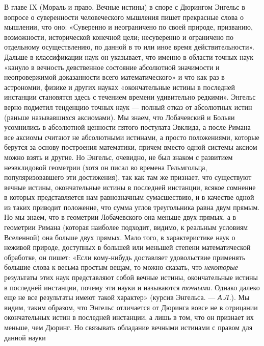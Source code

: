 В главе IX (Мораль и право,  Вечные истины) в споре с Дюрингом Энгельс
в вопросе о суверенности человеческого мышления пишет прекрасные слова
о  мышлении, что  оно:  «Суверенно и  неограничено  по своей  природе,
призванию,  возможности,  исторической  конечной цели;  несуверенно  и
ограничено  по  отдельному осуществлению,  по  данной  в то  или  иное
время  действительности». Дальше  в классификации  наук он  указывает,
что  именно  в области  точных  наук  «кануло в  вечность  девственное
состояние  абсолютной значимости  и неопровержимой  доказанности всего
математического»  и  что  как  раз   в  астрономии,  физике  и  других
науках «окончательные  истины в  последней инстанции  становятся здесь
с  течением  времени  удивительно  редкими».  Энгельс  верно  подметил
тенденцию точных  наук ---  полный отказ  от абсолютных  истин (раньше
называвшихся аксиомами). Мы знаем, что Лобачевский и Больяи усомнились
в  абсолютной  ценности  пятого  постулата  Эвклида,  а  после  Римана
все  аксиомы считают  не абсолютными  истинами, а  просто положениями,
которые берутся  за основу построения математики,  причем вместо одной
системы  аксиом  можно  взять  и  другие.  Но  Энгельс,  очевидно,  не
был  знаком  с развитием  неэвклидовой  геометрии  (хотя он  писал  во
времена Гельмгольца,  популяризовавшего эти  достижения), так  как там
же  признает, что  существуют  вечные истины,  окончательные истины  в
последней  инстанции, всякое  сомнение  в  которых представляется  нам
равнозначным  сумасшествию,  и  в  качестве одной  из  таких  приводит
положение,  что  сумма  углов   треугольника  равна  двум  прямым.  Но
мы  знаем,  что  в  геометрии Лобачевского  она  меньше  двух  прямых,
а   в  геометрии   Римана  (которая   наиболее  подходит,   видимо,  к
реальным  условиям Вселенной)  она больше  двух прямых.  Мало того,  в
характеристике  наук  о  неживой  природе,  доступных  в  большей  или
меньшей степени математической обработке,  он пишет: «Если кому-нибудь
доставляет  удовольствие  применять  большие слова  к  весьма  простым
вещам,  то можно  сказать, что  \emph{некоторые} результаты  этих наук
представляют  собой вечные  истины, окончательные  истины в  последней
инстанции,  почему  эти  науки  и  называются  \emph{точными}.  Однако
далеко еще не  все результаты имеют такой  характер» (курсив Энгельса.
---  \emph{А.Л.}). Мы  видим,  таким образом,  что Энгельс  отличается
от  Дюринга  вовсе не  в  отрицании  окончательных истин  в  последней
инстанции, а  лишь в том,  что он признает  их меньше, чем  Дюринг. Но
связывать  обладание  вечными  истинами  с  правом  для  данной  науки
